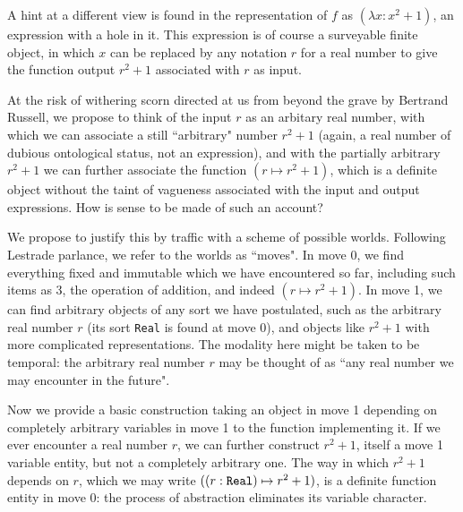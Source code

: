 \documentclass{slides}
\begin{document}
\begin{slide}

A hint at a different view is found in the representation of $f$ as $(\lambda x:x^2+1)$, an expression with a hole in it.  This expression is of course a surveyable finite object,
in which $x$ can be replaced by any notation $r$ for a real number to give the function output $r^2+1$ associated with $r$ as input.

At the risk of withering scorn directed at us from beyond the grave by Bertrand Russell, we propose to think of the input $r$ as an arbitary real number, with which we can associate
a still ``arbitrary" number $r^2+1$ (again, a real number of dubious ontological status, not an expression), and with the partially arbitrary  $r^2+1$ we can further associate
the function $(r \mapsto r^2+1)$, which is a definite object without the taint of vagueness associated with the input and output expressions.  How is sense to be made of such an account?

\end{slide}

\begin{slide}

We propose to justify this by traffic with a scheme of possible worlds.  Following Lestrade parlance, we refer to the worlds as ``moves".  In move 0, we find everything
fixed and immutable which we have encountered so far, including such items as 3, the operation of addition, and indeed $(r \mapsto r^2+1)$.  In move 1, we can find
arbitrary objects of any sort we have postulated, such as the arbitrary real number $r$ (its sort {\tt Real} is found at move 0), and objects like $r^2+1$ with more complicated representations.  The modality here might be taken to be temporal: the arbitrary real number $r$ may be thought of as ``any real number we may encounter in the future".

\end{slide}

\begin{slide}

Now we provide a basic construction taking an object in move 1 depending on completely arbitrary variables in move 1 to the function implementing it.  If we ever encounter
a real number $r$, we can further construct $r^2+1$, itself a move 1 variable entity, but not a completely arbitrary one.  The way in which $r^2+1$ depends on $r$,
which we may write $((r:{\tt Real}) \mapsto r^2+1)$, is a definite function entity in move 0:  the process of abstraction eliminates its variable character.

\end{slide}
\end{document}
